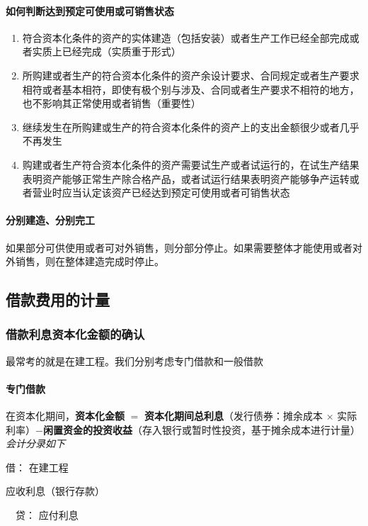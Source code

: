 \documentclass[UTF8,12pt]{ctexart}
\newenvironment{Dr}{\noindent 借：}{\par}
\newenvironment{Cr}{\noindent \ \ 贷：}{\par}
\numberwithin{equation}{section} %
\numberwithin{figure}{section}
\numberwithin{table}{section}
\begin{document}
	\paragraph{如何判断达到预定可使用或可销售状态}
	\begin{enumerate}
		\item 符合资本化条件的资产的实体建造（包括安装）或者生产工作已经全部完成或者实质上已经完成（实质重于形式）
		
		\item 所购建或者生产的符合资本化条件的资产余设计要求、合同规定或者生产要求相符或者基本相符，即使有极个别与涉及、合同或者生产要求不相符的地方，也不影响其正常使用或者销售（重要性）
		
		\item 继续发生在所购建或生产的符合资本化条件的资产上的支出金额很少或者几乎不再发生
		
		\item 购建或者生产符合资本化条件的资产需要试生产或者试运行的，在试生产结果表明资产能够正常生产除合格产品，或者试运行结果表明资产能够争产运转或者营业时应当认定该资产已经达到预定可使用或者可销售状态
	\end{enumerate}
	
	\paragraph{分别建造、分别完工}如果部分可供使用或者可对外销售，则分部分停止。如果需要整体才能使用或者对外销售，则在整体建造完成时停止。
	
	\subsection{借款费用的计量}
	
	\subsubsection{借款利息资本化金额的确认}
	最常考的就是在建工程。我们分别考虑专门借款和一般借款
	
	\paragraph{专门借款}
	在资本化期间，\textbf{资本化金额} $=$ \textbf{资本化期间总利息}（发行债券：摊余成本 $\times$ 实际利率）$-$\textbf{闲置资金的投资收益}（存入银行或暂时性投资，基于摊余成本进行计量）\textit{会计分录如下}
	
	\begin{Dr}
		在建工程
		
		应收利息（银行存款）
	\end{Dr}
	\begin{Cr}
		应付利息
	\end{Cr}
	
\end{document}
